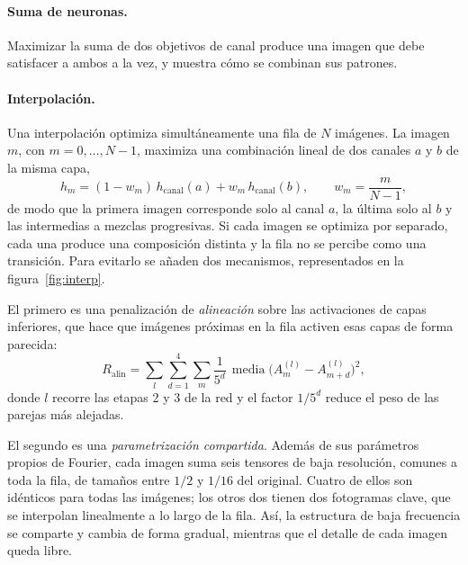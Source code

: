 \documentclass[11pt,a4paper]{article}
\begin{document}
\paragraph{Suma de neuronas.} Maximizar la suma de dos objetivos de canal
produce una imagen que debe satisfacer a ambos a la vez, y muestra cómo se
combinan sus patrones.

\paragraph{Interpolación.} Una interpolación optimiza simultáneamente una
fila de $N$ imágenes. La imagen $m$, con $m = 0, \dots, N-1$, maximiza una
combinación lineal de dos canales $a$ y $b$ de la misma capa,
\begin{equation}
h_m = (1 - w_m)\, h_{\text{canal}}(a) + w_m\, h_{\text{canal}}(b),
\qquad w_m = \frac{m}{N-1},
\end{equation}
de modo que la primera imagen corresponde solo al canal $a$, la última
solo al $b$ y las intermedias a mezclas progresivas. Si cada imagen se
optimiza por separado, cada una produce una composición distinta y la fila
no se percibe como una transición. Para evitarlo se añaden dos mecanismos,
representados en la figura~\ref{fig:interp}.

El primero es una penalización de \emph{alineación} sobre las activaciones
de capas inferiores, que hace que imágenes próximas en la fila activen esas
capas de forma parecida:
\begin{equation}
R_{\text{alin}} = \sum_{l} \sum_{d=1}^{4} \sum_{m} \frac{1}{5^{d}}\,
\operatorname{media}\bigl(A^{(l)}_{m} - A^{(l)}_{m+d}\bigr)^{2},
\end{equation}
donde $l$ recorre las etapas 2 y 3 de la red y el factor $1/5^{d}$ reduce el
peso de las parejas más alejadas.

El segundo es una \emph{parametrización compartida}. Además de sus
parámetros propios de Fourier, cada imagen suma seis tensores de baja
resolución, comunes a toda la fila, de tamaños entre $1/2$ y $1/16$ del
original. Cuatro de ellos son idénticos para todas las imágenes; los otros
dos tienen dos fotogramas clave, que se interpolan linealmente a lo largo
de la fila. Así, la estructura de baja frecuencia
se comparte y cambia de forma gradual, mientras que el detalle de cada
imagen queda libre.
\end{document}
